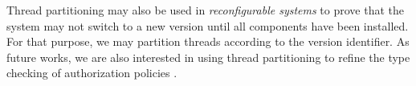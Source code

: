\documentclass{article}
\begin{document}
Thread partitioning may also be used in \emph{reconfigurable systems} to prove that the system may not switch to a new version until all components have  been installed. For that purpose, we may partition threads according to the version identifier. As future works, we are also  interested in using thread partitioning to refine the type checking of authorization policies \cite{authorization}.






\end{document}
